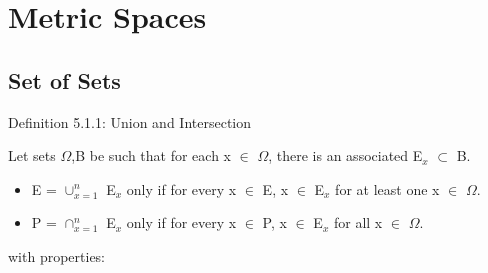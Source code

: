 \newpage
\section[Day 5: Metric Spaces and Set Types]{Metric Spaces}

\subsection{ Set of Sets } 

{ \color{blue} Definition 5.1.1: Union and Intersection } 

	\begin{adjustbox}{minipage=14cm, right}
		Let sets $\Omega$,B be such that for each x $\in$ $\Omega$,
		there is an associated E$_x$ $\subset$ B.
		\begin{itemize}[leftmargin=1cm]
			\item E = $\cup_{x=1}^{n}$ E$_x$ only if for every x $\in$ E, x $\in$ E$_x$ for
				at least one x $\in$ $\Omega$.

			\item P = $\cap_{x=1}^{n}$ E$_x$ only if for every x $\in$ P, x $\in$ E$_x$ for
				all x $\in$ $\Omega$.
		\end{itemize}
		with properties:
	\end{adjustbox}

